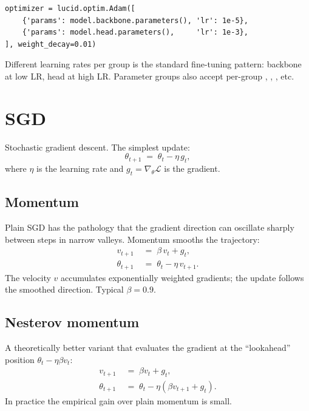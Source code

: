 \begin{lstlisting}[style=lucid,language=LucidPython]
optimizer = lucid.optim.Adam([
    {'params': model.backbone.parameters(), 'lr': 1e-5},
    {'params': model.head.parameters(),     'lr': 1e-3},
], weight_decay=0.01)
\end{lstlisting}

Different learning rates per group is the standard fine-tuning
pattern: backbone at low LR, head at high LR. Parameter groups
also accept per-group , ,
, etc.

\section{SGD}
\label{sec:optimizers:sgd}

Stochastic gradient descent. The simplest update:
\[
\theta_{t+1} \;=\; \theta_t - \eta\, g_t,
\]
where $\eta$ is the learning rate and $g_t = \nabla_\theta
\mathcal{L}$ is the gradient.

\subsection{Momentum}
\label{ssec:optimizers:momentum}

Plain SGD has the pathology that the gradient direction can
oscillate sharply between steps in narrow valleys. Momentum
smooths the trajectory:
\begin{align*}
v_{t+1} &\;=\; \beta\, v_t + g_t, \\
\theta_{t+1} &\;=\; \theta_t - \eta\, v_{t+1}.
\end{align*}
The velocity $v$ accumulates exponentially weighted gradients;
the update follows the smoothed direction. Typical $\beta = 0.9$.

\subsection{Nesterov momentum}
\label{ssec:optimizers:nesterov}

A theoretically better variant that evaluates the gradient at the
``lookahead'' position $\theta_t - \eta \beta v_t$:
\begin{align*}
v_{t+1} &\;=\; \beta v_t + g_t, \\
\theta_{t+1} &\;=\; \theta_t - \eta(\beta v_{t+1} + g_t).
\end{align*}
In practice the empirical gain over plain momentum is small.

